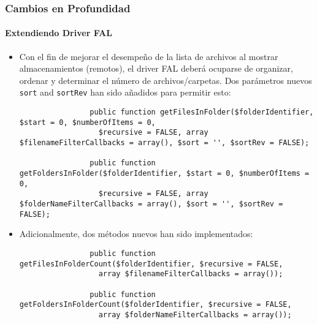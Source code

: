 \begin{frame}[fragile]
	\frametitle{Cambios en Profundidad}
	\framesubtitle{Extendiendo Driver FAL}

	\lstset{basicstyle=\tiny\ttfamily}

	\begin{itemize}
		\item Con el fin de mejorar el desempeño de la lista de archivos al mostrar
			almacenamientos (remotos), el driver FAL deberá ocuparse de organizar, ordenar y
			determinar el número de archivos/carpetas.
			Dos parámetros nuevos \texttt{sort} and \texttt{sortRev} han sido añadidos para permitir esto:

			\begin{lstlisting}
				public function getFilesInFolder($folderIdentifier, $start = 0, $numberOfItems = 0,
				  $recursive = FALSE, array $filenameFilterCallbacks = array(), $sort = '', $sortRev = FALSE);

				public function getFoldersInFolder($folderIdentifier, $start = 0, $numberOfItems = 0,
				  $recursive = FALSE, array $folderNameFilterCallbacks = array(), $sort = '', $sortRev = FALSE);
			\end{lstlisting}

		\item Adicionalmente, dos métodos nuevos han sido implementados:

			\begin{lstlisting}
				public function getFilesInFolderCount($folderIdentifier, $recursive = FALSE,
				  array $filenameFilterCallbacks = array());

				public function getFoldersInFolderCount($folderIdentifier, $recursive = FALSE,
				  array $folderNameFilterCallbacks = array());
			\end{lstlisting}

	\end{itemize}

\end{frame}

